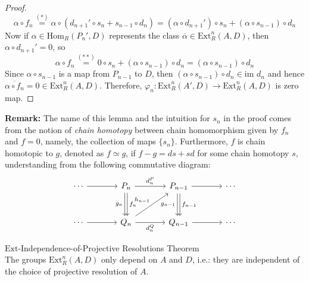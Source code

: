 \begin{proof}
\begin{equation*}
        \alpha \circ f_n \overset{(*)}{=} \alpha \circ (d_{n+1}' \circ s_n +s_{n-1} \circ d_n)= (\alpha \circ d_{n+1}') \circ s_n+ (\alpha \circ s_{n-1}) \circ d_n  \tag{**}
    \end{equation*}
    Now if $\alpha\in \text{Hom}_R (P_n',D)$ represents the class $\overline{\alpha} \in \text{Ext}_R^n (A,D)$, then $\alpha \circ d_{n+1}'=0$, so
    \[
    \alpha \circ f_n \overset{(**)}{=} 0 \circ s_n +(\alpha \circ s_{n-1}) \circ d_n= (\alpha \circ s_{n-1}) \circ d_n
    \]
    Since $\alpha \circ s_{n-1}$ is a map from $P_{n-1}$ to $D$, then $(\alpha \circ s_{n-1}) \circ d_n \in \text{im }d_n$ and hence $\overline{\alpha \circ f_n}=0 \in \text{Ext}_R^n (A,D)$. Therefore, $\varphi_n:\text{Ext}_R^n (A',D) \to \text{Ext}_R^n (A,D)$ is zero map.
\end{proof}

\noindent\textbf{Remark:} The name of this lemma and the intuition for $s_n$ in the proof comes from the notion of \textit{chain homotopy} between chain homomorphism given by $f_n$ and $f=0$, namely, the collection of maps $\{s_n\}$. Furthermore, $f$ is chain homotopic to $g$, denoted as $f\simeq g$, if $f-g= ds+sd$ for some chain homotopy $s$, understanding from the following commutative diagram:
\[
\begin{tikzcd}[row sep=large, column sep=large]
\cdots \arrow[r] & P_n \arrow[r, "d_n^P"] \arrow[d, "f_n", shift left=1.5pt] \arrow[d, "g_n"', shift right=1.5pt] & P_{n-1} \arrow[r] \arrow[d, "f_{n-1}", shift left=1.5pt] \arrow[d, "g_{n-1}"', shift right=1.5pt] & \cdots \\
\cdots \arrow[r] & Q_n \arrow[r, "d_n^Q"'] \arrow[ur, "h_{n-1}"] & Q_{n-1} \arrow[r] & \cdots
\end{tikzcd}
\]

\begin{theorem}{$\text{Ext}$-Independence-of-Projective Resolutions Theorem}\\
The groups $\text{Ext}_R^n (A,D)$ only depend on $A$ and $D$, i.e.: they are independent of the choice of projective resolution of $A$.
\end{theorem}


